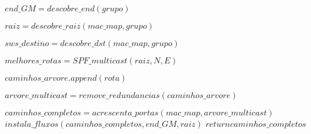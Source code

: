 {}
{
$ end\_GM =  descobre\_end(grupo) $

$ raiz = descobre\_raiz(mac\_map,grupo)$

$ sws\_destino  = descobre\_dst(mac\_map,grupo) $

$ melhores\_rotas = SPF\_multicast (raiz,N,E) $

	{
		{$ caminhos\_arvore.append(rota) $}
	}
	
$ arvore\_multicast= remove\_redundancias(caminhos\_arvore) $	

$ caminhos\_completos = acrescenta\_portas(mac\_map,arvore\_multicast) $
	$ instala\_fluxos(caminhos\_completos,end\_GM,raiz) $
$return caminhos\_completos$
}


